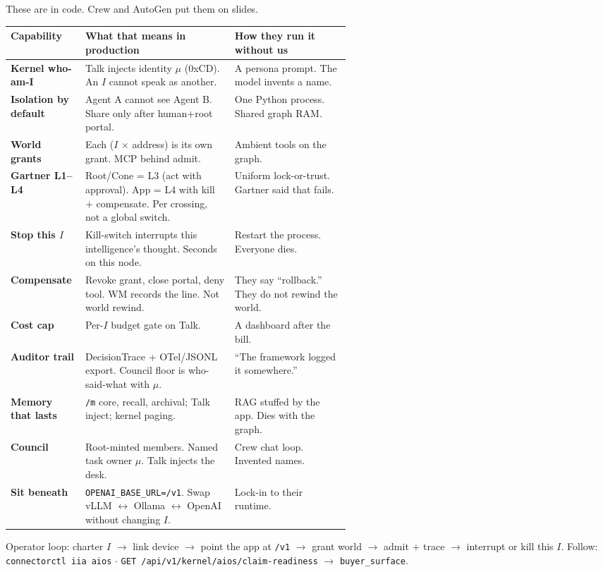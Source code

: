 \documentclass[10pt]{article}
\newcommand{\muted}[1]{\textcolor{textmuted}{#1}}
\begin{document}
These are in code. Crew and AutoGen put them on slides.

\renewcommand{\arraystretch}{1.12}
{\small
\begin{tabularx}{\linewidth}{@{}>{\bfseries\arraybackslash}p{0.22\linewidth} X >{\raggedright\arraybackslash}p{0.34\linewidth}@{}}
\toprule
Capability & What that means in production & How they run it without us \\
\midrule
Kernel who-am-I & Talk injects identity $\mu$ (0xCD). An $I$ cannot speak as another. & A persona prompt. The model invents a name. \\
Isolation by default & Agent A cannot see Agent B. Share only after human+root portal. & One Python process. Shared graph RAM. \\
World grants & Each ($I$ $\times$ address) is its own grant. MCP behind admit. & Ambient tools on the graph. \\
Gartner L1--L4 & Root/Cone = L3 (act with approval). App = L4 with kill + compensate. Per crossing, not a global switch. & Uniform lock-or-trust. Gartner said that fails. \\
Stop this $I$ & Kill-switch interrupts this intelligence's thought. Seconds on this node. & Restart the process. Everyone dies. \\
Compensate & Revoke grant, close portal, deny tool. WM records the line. Not world rewind. & They say ``rollback.'' They do not rewind the world. \\
Cost cap & Per-$I$ budget gate on Talk. & A dashboard after the bill. \\
Auditor trail & DecisionTrace + OTel/JSONL export. Council floor is who-said-what with $\mu$. & ``The framework logged it somewhere.'' \\
Memory that lasts & \texttt{/m} core, recall, archival; Talk inject; kernel paging. & RAG stuffed by the app. Dies with the graph. \\
Council & Root-minted members. Named task owner $\mu$. Talk injects the desk. & Crew chat loop. Invented names. \\
Sit beneath & \texttt{OPENAI\_BASE\_URL=/v1}. Swap vLLM $\leftrightarrow$ Ollama $\leftrightarrow$ OpenAI without changing $I$. & Lock-in to their runtime. \\
\bottomrule
\end{tabularx}
}

\vspace{0.2em}
{\footnotesize\muted{Operator loop: charter $I$ $\rightarrow$ link device $\rightarrow$ point the app at \texttt{/v1} $\rightarrow$ grant world $\rightarrow$ admit + trace $\rightarrow$ interrupt or kill this $I$. Follow: \texttt{connectorctl iia aios} $\cdot$ \texttt{GET /api/v1/kernel/aios/claim-readiness} $\rightarrow$ \texttt{buyer\_surface}.}}
\end{document}
